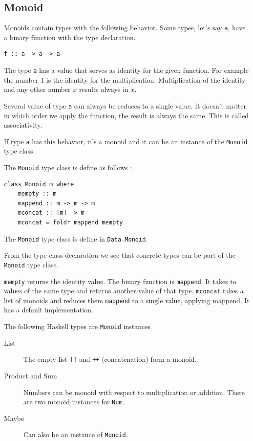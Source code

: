 \subsection{Monoid}
\label{sec:monoid}

Monoids contain types with the following behavior. 
Some types, let's say \verb|a|, have a binary function with the type declaration. 
\begin{verbatim}
f :: a -> a -> a
\end{verbatim}

The type \verb|a| has a value that serves as identity for the given function. For example the number 1 is the identity for the multiplication. Multiplication of the identity and any other number $x$ results always in $x$.

Several value of type \verb|a| can always be reduces to a single value. It doesn't matter in which order we apply the function, the result is always the same. This is called associativity.

If type \verb|a| has this behavior, it's a monoid and it can be an instance of the \verb|Monoid| type class.

The \verb|Monoid| type class is define as follows \cite{monoid}:
\begin{verbatim}
class Monoid m where
    mempty :: m
    mappend :: m -> m -> m
    mconcat :: [m] -> m
    mconcat = foldr mappend mempty
\end{verbatim}

The \verb|Monoid| type class is define in \verb|Data.Monoid|. 

From the type class declaration we see that concrete types can be part of the \verb|Monoid| type class. 

\verb|mempty| returns the identity value. The binary function is \verb|mappend|. It takes to values of the same type and returns another value of that type. \verb|mconcat| takes a list of monoids and reduces them \verb|mappend| to a single value, applying mappend. It has a default implementation.

The following Haskell types are \verb|Monoid| instances
\begin{description}
\item[List] The empty list \verb|[]| and \verb|++| (concatenation) form a monoid.
\item[Product and Sum] Numbers can be monoid with respect to multiplication or addition. There are two monoid instances for \verb|Num|.
\item[Maybe] Can also be an instance of \verb|Monoid|.
\end{description}


